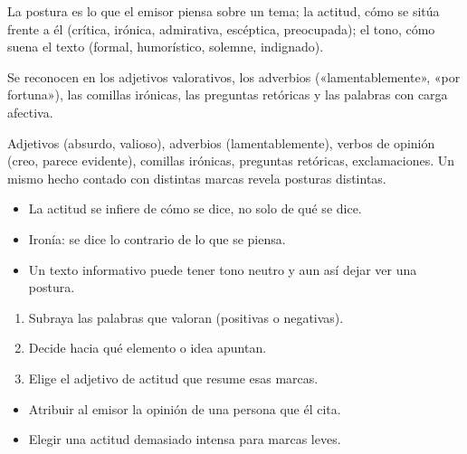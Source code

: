 \documentclass[10pt,a4paper,twocolumn]{article}
\begin{document}
La postura es lo que el emisor piensa sobre un tema; la actitud, cómo se sitúa frente a él (crítica, irónica, admirativa, escéptica, preocupada); el tono, cómo suena el texto (formal, humorístico, solemne, indignado).

Se reconocen en los adjetivos valorativos, los adverbios («lamentablemente», «por fortuna»), las comillas irónicas, las preguntas retóricas y las palabras con carga afectiva.

\begin{definicion}
Adjetivos (absurdo, valioso), adverbios (lamentablemente), verbos de opinión (creo, parece evidente), comillas irónicas, preguntas retóricas, exclamaciones. Un mismo hecho contado con distintas marcas revela posturas distintas.
\end{definicion}

\begin{ideasclave}
\begin{itemize}
  \item La actitud se infiere de cómo se dice, no solo de qué se dice.
  \item Ironía: se dice lo contrario de lo que se piensa.
  \item Un texto informativo puede tener tono neutro y aun así dejar ver una postura.
\end{itemize}
\end{ideasclave}

\begin{metodo}
\begin{enumerate}
  \item Subraya las palabras que valoran (positivas o negativas).
  \item Decide hacia qué elemento o idea apuntan.
  \item Elige el adjetivo de actitud que resume esas marcas.
\end{enumerate}
\end{metodo}

\begin{errorfrecuente}
\begin{itemize}
  \item Atribuir al emisor la opinión de una persona que él cita.
  \item Elegir una actitud demasiado intensa para marcas leves.
\end{itemize}
\end{errorfrecuente}
\end{document}
